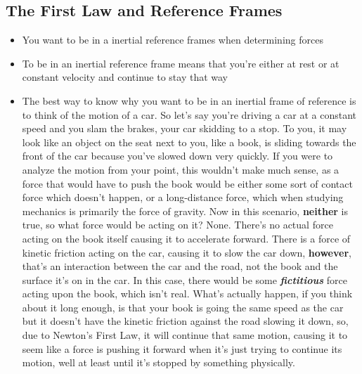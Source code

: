 \documentclass[openany]{book}
\begin{document}
\subsection{The First Law and Reference Frames}
\begin{itemize}
    \item You want to be in a inertial reference frames when determining forces
    \item To be in an inertial reference frame means that you're either at rest or at constant velocity and continue to stay that way
    \item The best way to know why you want to be in an inertial frame of reference is to think of the motion of a car. So let's say you're driving a car at a constant speed and you slam the brakes, your car skidding to a stop. To you, it may look like an object on the seat next to you, like a book, is sliding towards the front of the car because you've slowed down very quickly. If you were to analyze the motion from your point, this wouldn't make much sense, as a force that would have to push the book would be either some sort of contact force which doesn't happen, or a long-distance force, which when studying mechanics is primarily the force of gravity. Now in this scenario, {\bfseries{neither}} is true, so what force would be acting on it? None. There's no actual force acting on the book itself causing it to accelerate forward. There is a force of kinetic friction acting on the car, causing it to slow the car down, {\bfseries{however}}, that's an interaction between the car and the road, not the book and the surface it's on in the car. In this case, there would be some {\bfseries{\textit{fictitious}}} force acting upon the book, which isn't real. What's actually happen, if you think about it long enough, is that your book is going the same speed as the car but it doesn't have the kinetic friction against the road slowing it down, so, due to Newton's First Law, it will continue that same motion, causing it to seem like a force is pushing it forward when it's just trying to continue its motion, well at least until it's stopped by something physically.
\end{itemize}
\end{document}
